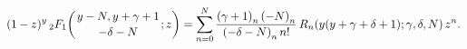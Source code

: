 \[(1-z)^{y}\mathop{{{}_{2}F_{1}}\/}\nolimits\!\left({y-N,y+\gamma+1\atop-\delta-%
N};z\right)=\sum_{n=0}^{N}\frac{\left(\gamma+1\right)_{n}\left(-N\right)_{n}}{%
\left(-\delta-N\right)_{n}n!}\*\mathop{R_{n}\/}\nolimits\!\left(y(y+\gamma+%
\delta+1);\gamma,\delta,N\right)z^{n}.\]